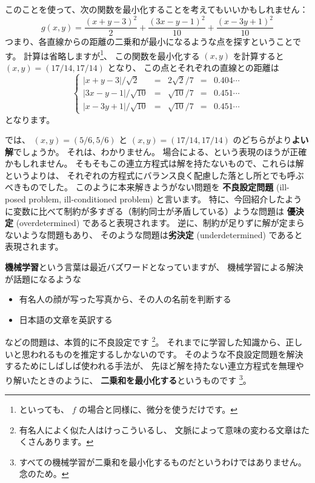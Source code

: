 \documentclass[uplatex,dvipdfmx]{jsarticle}
\begin{document}
  このことを使って、次の関数を最小化することを考えてもいいかもしれません：
  \[
    g(x,y) = \frac{(x+y-3)^2}{2} + \frac{(3x-y-1)^2}{10} + \frac{(x-3y+1)^2}{10}
  \]
  つまり、各直線からの距離の二乗和が最小になるような点を探すということです。
  計算は省略しますが\footnote{といっても、 $f$ の場合と同様に、微分を使うだけです。}、
  この関数を最小化する $(x,y)$ を計算すると $(x,y) = (17/14, 17/14)$ となり、
  この点とそれぞれの直線との距離は
  \[
    \left\{
    \begin{array}{lllll}
      |x + y  - 3| /\sqrt{2}  &=& 2\sqrt{2}/7 &=& 0.404\cdots \\
      |3x - y - 1| /\sqrt{10} &=& \sqrt{10}/7 &=& 0.451\cdots\\
      |x - 3y + 1| /\sqrt{10} &=& \sqrt{10}/7 &=& 0.451\cdots
    \end{array}
    \right.
  \]
  となります。

  では、 $(x,y) = (5/6, 5/6)$ と $(x,y) = (17/14, 17/14)$ のどちらがより\textbf{よい解}でしょうか。
  それは、わかりません。
  場合による、という表現のほうが正確かもしれません。
  そもそもこの連立方程式は解を持たないもので、これらは解というよりは、
  それぞれの方程式にバランス良く配慮した落とし所とでも呼ぶべきものでした。
  このように本来解きようがない問題を
  \textbf{不良設定問題} (ill-posed problem, ill-conditioned problem)
  と言います。
  特に、今回紹介したように変数に比べて制約が多すぎる（制約同士が矛盾している）ような問題は
  \textbf{優決定} (overdetermined) であると表現されます。
  逆に、制約が足りずに解が定まらないような問題もあり、
  そのような問題は\textbf{劣決定} (underdetermined) であると表現されます。

  \textbf{機械学習}という言葉は最近バズワードとなっていますが、
  機械学習による解決が話題になるような
  \begin{itemize}
    \item 有名人の顔が写った写真から、その人の名前を判断する
    \item 日本語の文章を英訳する
  \end{itemize}
  などの問題は、本質的に不良設定です
  \footnote{
    有名人によく似た人はけっこういるし、
    文脈によって意味の変わる文章はたくさんあります。
  }。
  それまでに学習した知識から、正しいと思われるものを推定するしかないのです。
  そのような不良設定問題を解決するためにしばしば使われる手法が、
  先ほど解を持たない連立方程式を無理やり解いたときのように、
  \textbf{二乗和を最小化する}というものです
  \footnote{
    すべての機械学習が二乗和を最小化するものだというわけではありません。念のため。
  }。
\end{document}
